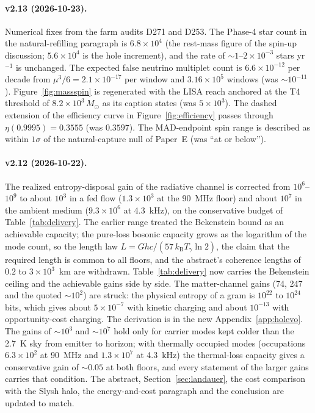 \documentclass[11pt]{article}
\newcommand{\msun}{\ensuremath{M_\odot}}
\newcommand{\kb}{\ensuremath{k_{\mathrm{B}}}}
\begin{document}
\paragraph{v2.13 (2026-10-23).} Numerical fixes from the farm audits D271 and D253. The Phase-4 star count in the natural-refilling paragraph is $6.8\times10^{4}$ (the rest-mass figure of the spin-up discussion; $5.6\times10^{4}$ is the hole increment), and the rate of $\sim 1$--$2\times10^{-3}$ stars yr$^{-1}$ is unchanged. The expected false neutrino multiplet count is $6.6\times10^{-12}$ per decade from $\mu^{3}/6 = 2.1\times10^{-17}$ per window and $3.16\times10^{5}$ windows (was $\sim 10^{-11}$). Figure~\ref{fig:massspin} is regenerated with the LISA reach anchored at the T4 threshold of $8.2\times10^{3}\,\msun$ as its caption states (was $5\times10^{3}$). The dashed extension of the efficiency curve in Figure~\ref{fig:efficiency} passes through $\eta(0.9995) = 0.3555$ (was $0.3597$). The MAD-endpoint spin range is described as within $1\sigma$ of the natural-capture null of Paper~E (was ``at or below'').

\paragraph{v2.12 (2026-10-22).} The realized entropy-disposal gain of the radiative channel is corrected from $10^{6}$--$10^{9}$ to about $10^{3}$ in a fed flow ($1.3\times10^{3}$ at the 90~MHz floor) and about $10^{7}$ in the ambient medium ($9.3\times10^{6}$ at 4.3~kHz), on the conservative budget of Table~\ref{tab:delivery}. The earlier range treated the Bekenstein bound as an achievable capacity; the pure-loss bosonic capacity \citep{Giovannetti2004} grows as the logarithm of the mode count, so the length law $L = Ghc/(57\,\kb T_\gamma \ln 2)$, the claim that the required length is common to all floors, and the abstract's coherence lengths of $0.2$ to $3\times10^{3}$~km are withdrawn. Table~\ref{tab:delivery} now carries the Bekenstein ceiling and the achievable gains side by side. The matter-channel gains (74, 247 and the quoted $\sim 10^{2}$) are struck: the physical entropy of a gram is $10^{22}$ to $10^{24}$ bits, which gives about $5\times10^{-7}$ with kinetic charging and about $10^{-13}$ with opportunity-cost charging. The derivation is in the new Appendix~\ref{app:holevo}. The gains of $\sim 10^{3}$ and $\sim 10^{7}$ hold only for carrier modes kept colder than the 2.7~K sky from emitter to horizon; with thermally occupied modes (occupations $6.3\times10^{2}$ at 90~MHz and $1.3\times10^{7}$ at 4.3~kHz) the thermal-loss capacity gives a conservative gain of $\sim 0.05$ at both floors, and every statement of the larger gains carries that condition. The abstract, Section~\ref{sec:landauer}, the cost comparison with the Slysh halo, the energy-and-cost paragraph and the conclusion are updated to match.
\end{document}
